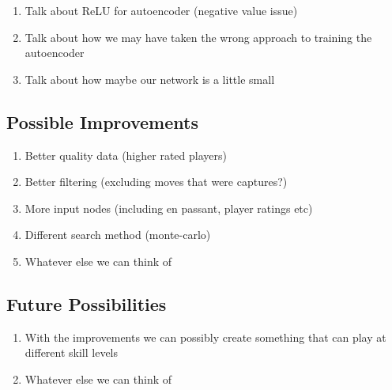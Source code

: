 \documentclass[12pt]{article}
\begin{document}
    \begin{enumerate}
        \item Talk about ReLU for autoencoder (negative value issue)
        \item Talk about how we may have taken the wrong approach to training the autoencoder
        \item Talk about how maybe our network is a little small 
    \end{enumerate}

    \subsection{Possible Improvements}

    \begin{enumerate}
        \item Better quality data (higher rated players)
        \item Better filtering (excluding moves that were captures?)
        \item More input nodes (including en passant, player ratings etc)
        \item Different search method (monte-carlo)
        \item Whatever else we can think of
    \end{enumerate}

    \subsection{Future Possibilities}

    \begin{enumerate}
        \item With the improvements we can possibly create something that can play at different skill levels 
        \item Whatever else we can think of
    \end{enumerate}
    
    \clearpage
    \printbibliography
\end{document}
